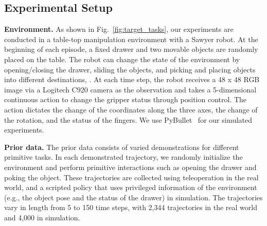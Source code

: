 
\subsection{Experimental Setup}
\label{sec:experimental_setup}


\textbf{Environment.}
As shown in Fig.~\ref{fig:target_tasks}, our experiments are conducted in a table-top manipulation environment with a Sawyer robot. At the beginning of each episode, a fixed drawer and two movable objects are randomly placed on the table. The robot can change the state of the environment by opening/closing the drawer, sliding the objects, and picking and placing objects into different destinations, \etc. At each time step, the robot receives a 48 x 48 RGB image via a Logitech C920 camera as the observation and takes a 5-dimensional continuous action to change the gripper status through position control. The action dictates the change of the coordinates along the three axes, the change of the rotation, and the status of the fingers. We use PyBullet~\citep{coumans2021} for our simulated experiments.  


\textbf{Prior data.}
The prior data consists of varied demonstrations for different primitive tasks. In each demonstrated trajectory, we randomly initialize the environment and perform primitive interactions such as opening the drawer and poking the object. These trajectories are collected using teleoperation in the real world, and a scripted policy that uses privileged information of the environment (e.g., the object pose and the status of the drawer) in simulation. The trajectories vary in length from 5 to 150 time steps, with 2,344 trajectories in the real world and 4,000 in simulation.

